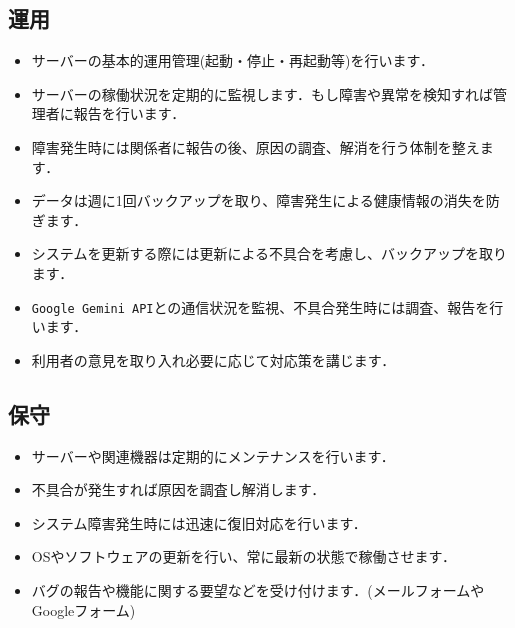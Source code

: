 \documentclass[uplatex,dvipdfmx]{jlreq}
\begin{document}
\subsection{運用}

\begin{itemize}

  \item サーバーの基本的運用管理(起動・停止・再起動等)を行います．

  \item サーバーの稼働状況を定期的に監視します．もし障害や異常を検知すれば管理者に報告を行います．

  \item 障害発生時には関係者に報告の後、原因の調査、解消を行う体制を整えます．

  \item データは週に1回バックアップを取り、障害発生による健康情報の消失を防ぎます．

  \item システムを更新する際には更新による不具合を考慮し、バックアップを取ります．

  \item \verb|Google Gemini API|との通信状況を監視、不具合発生時には調査、報告を行います．

  \item 利用者の意見を取り入れ必要に応じて対応策を講じます．

\end{itemize}



\subsection{保守}

\begin{itemize}

  \item サーバーや関連機器は定期的にメンテナンスを行います．

  \item 不具合が発生すれば原因を調査し解消します．

  \item システム障害発生時には迅速に復旧対応を行います．

  \item OSやソフトウェアの更新を行い、常に最新の状態で稼働させます．

  \item バグの報告や機能に関する要望などを受け付けます．(メールフォームやGoogleフォーム)

\end{itemize}
\end{document}
